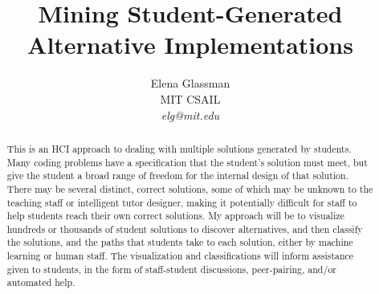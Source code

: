 \documentclass[12pt]{article}
\begin{document}
\title{Mining Student-Generated Alternative Implementations}

\author{Elena Glassman \\ MIT CSAIL \\ \textit{elg@mit.edu}
}

\maketitle

\begin{abstract}
This is an HCI approach to dealing with multiple solutions generated by students. Many coding problems have a specification that the student's solution must meet, but give the student a broad range of freedom for the internal design of that solution. There may be several distinct, correct solutions, some of which may be unknown to the teaching staff or intelligent tutor designer, making it potentially difficult for staff to help students reach their own correct solutions. My approach will be to visualize hundreds or thousands of student solutions to discover alternatives, and then classify the solutions, and the paths that students take to each solution, either by machine learning or human staff. The visualization and classifications will inform assistance given to students, in the form of staff-student discussions, peer-pairing, and/or automated help.

\end{abstract}
\end{document}
